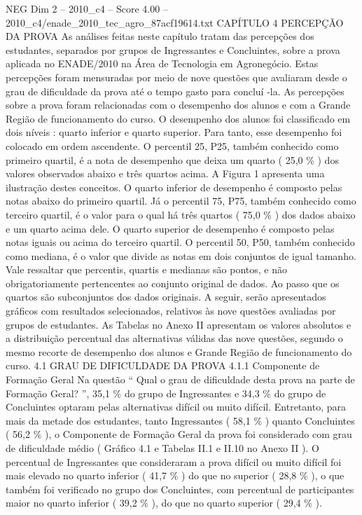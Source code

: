 \begin{textsample}{NEG Dim 2 – 2010\_c4 – Score 4.00 – 2010\_c4/enade\_2010\_tec\_agro\_87acf19614.txt}  \label{ex:f2_neg_286}
CAPÍTULO 4 PERCEPÇÃO DA PROVA As análises feitas neste capítulo tratam das percepções dos estudantes, separados por grupos de Ingressantes e Concluintes, sobre a prova aplicada no ENADE/2010 na Área de Tecnologia em Agronegócio.
Estas percepções foram mensuradas por meio de nove questões que avaliaram desde o grau de dificuldade da prova até o tempo gasto para concluí -la.
As percepções sobre a prova foram relacionadas com o desempenho dos alunos e com a Grande Região de funcionamento do curso.
O desempenho dos alunos foi classificado em dois níveis : quarto inferior e quarto superior.
Para tanto, esse desempenho foi colocado em ordem ascendente.
O percentil 25, P25, também conhecido como primeiro quartil, é a nota de desempenho que deixa um quarto ( 25,0 \% ) dos valores observados abaixo e três quartos acima.
A Figura 1 apresenta uma ilustração destes conceitos.
O quarto inferior de desempenho é composto pelas notas abaixo do primeiro quartil.
Já o percentil 75, P75, também conhecido como terceiro quartil, é o valor para o qual há três quartos ( 75,0 \% ) dos dados abaixo e um quarto acima dele.
O quarto superior de desempenho é composto pelas notas iguais ou acima do terceiro quartil.
O percentil 50, P50, também conhecido como mediana, é o valor que divide as notas em dois conjuntos de igual tamanho.
Vale ressaltar que percentis, quartis e medianas são pontos, e não obrigatoriamente pertencentes ao conjunto original de dados.
Ao passo que os quartos são subconjuntos dos dados originais.
A seguir, serão apresentados gráficos com resultados selecionados, relativos às nove questões avaliadas por grupos de estudantes.
As Tabelas no Anexo II apresentam os valores absolutos e a distribuição percentual das alternativas válidas das nove questões, segundo o mesmo recorte de desempenho dos alunos e Grande Região de funcionamento do curso. 4.1 GRAU DE DIFICULDADE DA PROVA 4.1.1 Componente de Formação Geral Na questão “ Qual o grau de dificuldade desta prova na parte de Formação Geral? ”, 35,1 \% do grupo de Ingressantes e 34,3 \% do grupo de Concluintes optaram pelas alternativas difícil ou muito difícil.
Entretanto, para mais da metade dos estudantes, tanto Ingressantes ( 58,1 \% ) quanto Concluintes ( 56,2 \% ), o Componente de Formação Geral da prova foi considerado com grau de dificuldade médio ( Gráfico 4.1 e Tabelas II.1 e II.10 no Anexo II ).
O percentual de Ingressantes que consideraram a prova difícil ou muito difícil foi mais elevado no quarto inferior ( 41,7 \% ) do que no superior ( 28,8 \% ), o que também foi verificado no grupo dos Concluintes, com percentual de participantes maior no quarto inferior ( 39,2 \% ), do que no quarto superior ( 29,4 \% ).

\end{textsample}
